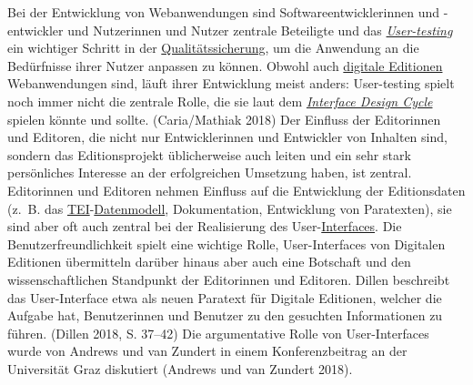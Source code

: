 \documentclass{article}
\begin{document}
    Bei der Entwicklung von Webanwendungen sind Softwareentwicklerinnen und
                  -entwickler und Nutzerinnen und Nutzer zentrale Beteiligte und das \emph{\href{http://gams.uni-graz.at/o:konde.206}{User-testing}} ein wichtiger Schritt in der \href{http://gams.uni-graz.at/o:konde.182}{Qualitätssicherung}, um die Anwendung an die Bedürfnisse ihrer Nutzer
                  anpassen zu können. Obwohl auch \href{http://gams.uni-graz.at/o:konde.59}{digitale
                     Editionen} Webanwendungen sind, läuft ihrer Entwicklung meist anders:
                  User-testing spielt noch immer nicht die zentrale Rolle, die sie laut dem \emph{\href{http://gams.uni-graz.at/o:konde.99}{Interface Design Cycle}} spielen könnte und sollte. (Caria/Mathiak 2018) Der Einfluss
                  der Editorinnen und Editoren, die nicht nur Entwicklerinnen und Entwickler von
                  Inhalten sind, sondern das Editionsprojekt üblicherweise auch leiten und ein sehr
                  stark persönliches Interesse an der erfolgreichen Umsetzung haben, ist zentral.
                  Editorinnen und Editoren nehmen Einfluss auf die Entwicklung der Editionsdaten
                  (z. B. das \href{http://gams.uni-graz.at/o:konde.178}{TEI}-\href{http://gams.uni-graz.at/o:konde.137}{Datenmodell}, Dokumentation,
                  Entwicklung von Paratexten), sie sind aber oft auch zentral bei der Realisierung
                  des User-\href{http://gams.uni-graz.at/o:konde.98}{Interfaces}. Die
                  Benutzerfreundlichkeit spielt eine wichtige Rolle, User-Interfaces von Digitalen
                  Editionen übermitteln darüber hinaus aber auch eine Botschaft und den
                  wissenschaftlichen Standpunkt der Editorinnen und Editoren. Dillen beschreibt das
                  User-Interface etwa als neuen Paratext für Digitale Editionen, welcher die Aufgabe
                  hat, Benutzerinnen und Benutzer zu den gesuchten Informationen zu führen.
                     (Dillen 2018, S. 37–42) Die argumentative Rolle von
                  User-Interfaces wurde von Andrews und van Zundert in einem Konferenzbeitrag an der
                  Universität Graz diskutiert (Andrews und van Zundert 2018).\\
            
\end{document}
